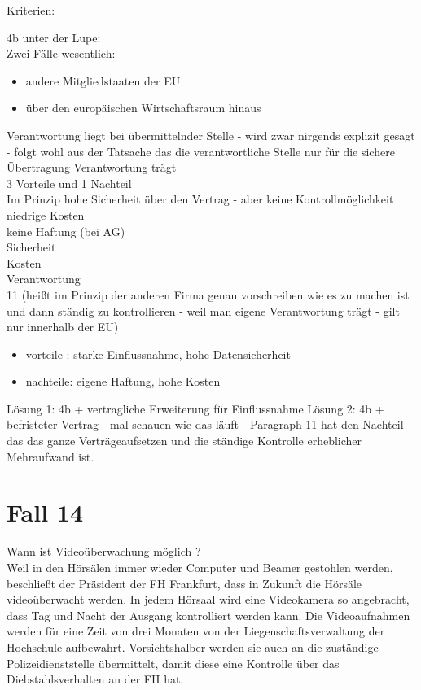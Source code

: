 \documentclass[a4paper,10pt]{scrartcl}
\begin{document}
Kriterien:

4b unter der Lupe:\\

Zwei Fälle wesentlich: 
\begin{itemize}
 \item andere Mitgliedstaaten der EU 
 \item über den europäischen Wirtschaftsraum hinaus
\end{itemize}
Verantwortung liegt bei übermittelnder Stelle - wird zwar nirgends explizit
gesagt - folgt wohl aus der Tatsache das die verantwortliche Stelle
nur für die sichere Übertragung Verantwortung trägt\\
3 Vorteile und 1 Nachteil\\
Im Prinzip hohe Sicherheit über den Vertrag - aber keine Kontrollmöglichkeit\\
niedrige Kosten\\
keine Haftung (bei AG)\\

Sicherheit \\
Kosten \\
Verantwortung\\

11 (heißt im Prinzip der anderen Firma genau vorschreiben wie es zu machen ist
und dann ständig zu kontrollieren - weil man eigene Verantwortung trägt - gilt nur 
innerhalb der EU)
\begin{itemize}
 \item vorteile : starke Einflussnahme, hohe Datensicherheit
 \item nachteile: eigene Haftung, hohe Kosten
\end{itemize}

Lösung 1: 4b + vertragliche Erweiterung für Einflussnahme
Lösung 2: 4b + befristeter Vertrag - mal schauen wie das läuft - Paragraph 11 hat den 
Nachteil das das ganze Verträgeaufsetzen und die ständige Kontrolle erheblicher
Mehraufwand ist.

\section{Fall 14}

Wann ist Videoüberwachung möglich ?\\
Weil in den Hörsälen immer wieder Computer und Beamer 
gestohlen werden, beschließt der Präsident der FH Frankfurt, dass 
in Zukunft die Hörsäle videoüberwacht werden. In jedem Hörsaal 
wird eine Videokamera so angebracht, dass Tag und Nacht der 
Ausgang kontrolliert werden kann. Die Videoaufnahmen werden für 
eine Zeit von drei Monaten von der Liegenschaftsverwaltung der 
Hochschule aufbewahrt. Vorsichtshalber werden sie auch an die 
zuständige Polizeidienststelle übermittelt, damit diese eine Kontrolle 
über das Diebstahlsverhalten an der FH hat.\\
\end{document}
